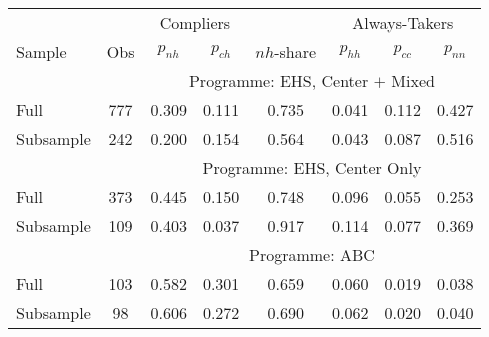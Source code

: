 \begin{tabular}{lccccccc}
\toprule 
\midrule 
\multicolumn{2}{c}{} & \multicolumn{2}{c}{Compliers} &  & \multicolumn{3}{c}{Always-Takers} \\
 \cmidrule(lr){3-4} \cmidrule(lr){6-8} 
Sample & Obs & $p_{nh}$ & $p_{ch}$ & $nh$-share & $p_{hh}$ & $p_{cc}$ & $p_{nn}$ \\
\midrule 
 &  & \multicolumn{6}{c}{Programme: EHS, Center $+$ Mixed} \\
 \cmidrule(lr){3-8} 
Full & 777 & 0.309 & 0.111 & 0.735 & 0.041 & 0.112 & 0.427 \\
Subsample & 242 & 0.200 & 0.154 & 0.564 & 0.043 & 0.087 & 0.516 \\
\midrule 
 &  & \multicolumn{6}{c}{Programme: EHS, Center Only} \\
 \cmidrule(lr){3-8} 
Full & 373 & 0.445 & 0.150 & 0.748 & 0.096 & 0.055 & 0.253 \\
Subsample & 109 & 0.403 & 0.037 & 0.917 & 0.114 & 0.077 & 0.369 \\
\midrule 
 &  & \multicolumn{6}{c}{Programme: ABC} \\
 \cmidrule(lr){3-8} 
Full & 103 & 0.582 & 0.301 & 0.659 & 0.060 & 0.019 & 0.038 \\
Subsample & 98 & 0.606 & 0.272 & 0.690 & 0.062 & 0.020 & 0.040 \\
\midrule 
\bottomrule 
\end{tabular}
